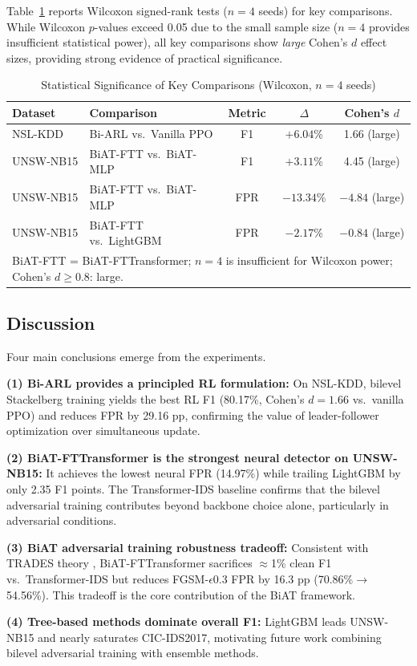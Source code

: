 Table~\ref{tab:significance} reports Wilcoxon signed-rank tests ($n=4$ seeds) for key comparisons. While Wilcoxon $p$-values exceed 0.05 due to the small sample size ($n=4$ provides insufficient statistical power), all key comparisons show \emph{large} Cohen's $d$ effect sizes, providing strong evidence of practical significance.

\begin{table}[h]
    \centering
    \caption{Statistical Significance of Key Comparisons (Wilcoxon, $n{=}4$ seeds)}
    \label{tab:significance}
    \begin{tabular}{llccc}
        \toprule
        \textbf{Dataset} & \textbf{Comparison} & \textbf{Metric} & \textbf{$\Delta$} & \textbf{Cohen's $d$} \\
        \midrule
        NSL-KDD   & Bi-ARL vs.\ Vanilla PPO    & F1  & $+6.04$\% & 1.66 (large) \\
        UNSW-NB15 & BiAT-FTT vs.\ BiAT-MLP     & F1  & $+3.11$\% & 4.45 (large) \\
        UNSW-NB15 & BiAT-FTT vs.\ BiAT-MLP     & FPR & $-13.34$\% & $-4.84$ (large) \\
        UNSW-NB15 & BiAT-FTT vs.\ LightGBM     & FPR & $-2.17$\% & $-0.84$ (large) \\
        \bottomrule
        \multicolumn{5}{l}{\scriptsize{BiAT-FTT = BiAT-FTTransformer; $n{=}4$ is insufficient for Wilcoxon power; Cohen's $d \geq 0.8$: large.}}
    \end{tabular}
\end{table}

\subsection{Discussion}

Four main conclusions emerge from the experiments.

\textbf{(1) Bi-ARL provides a principled RL formulation:} On NSL-KDD, bilevel Stackelberg training yields the best RL F1 (80.17\%, Cohen's $d=1.66$ vs.\ vanilla PPO) and reduces FPR by 29.16 pp, confirming the value of leader-follower optimization over simultaneous update.

\textbf{(2) BiAT-FTTransformer is the strongest neural detector on UNSW-NB15:} It achieves the lowest neural FPR (14.97\%) while trailing LightGBM by only 2.35 F1 points. The Transformer-IDS baseline confirms that the bilevel adversarial training contributes beyond backbone choice alone, particularly in adversarial conditions.

\textbf{(3) BiAT adversarial training robustness tradeoff:} Consistent with TRADES theory \cite{zhang2019trades}, BiAT-FTTransformer sacrifices $\approx$1\% clean F1 vs.\ Transformer-IDS but reduces FGSM-$\epsilon$0.3 FPR by 16.3 pp (70.86\%$\to$54.56\%). This tradeoff is the core contribution of the BiAT framework.

\textbf{(4) Tree-based methods dominate overall F1:} LightGBM leads UNSW-NB15 and nearly saturates CIC-IDS2017, motivating future work combining bilevel adversarial training with ensemble methods.
